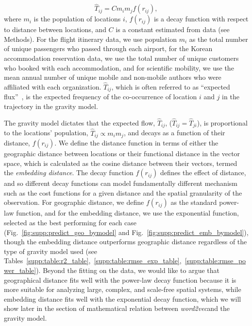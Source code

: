 \documentclass[12pt]{article} %
\begin{document}
\begin{equation}
	\label{eq:gravity_basic}
	\hat{T}_{ij} = Cm_{i}m_{j}f(r_{ij}),
\end{equation}
where $m_{i}$ is the population of locations $i$,  $f(r_{ij})$ is a decay function with respect to distance between locations, and $C$ is a constant estimated from data (see Methods).
For the flight itinerary data, we use population $m_{i}$ as the total number of unique passengers who passed through each airport, for the Korean accommodation reservation data, we use the total number of unique customers who booked with each accommodation, and for scientific mobility, we use the mean annual number of unique mobile and non-mobile authors who were affiliated with each organization.
$\hat{T}_{ij}$, which is often referred to as ``expected flux''~\autocite{simini2012universal}, is the expected frequency of the co-occurrence of location $i$ and $j$ in the trajectory in the gravity model.

The gravity model dictates that the expected flow, $\hat{T}_{ij}$, ($\hat{T}_{ij }= \hat{T}_{ji}$), is proportional to the locations' population, $\hat{T}_{ij} \propto m_{i} m_{j}$, and decays as a function of their distance, $f(r_{ij})$.
We define the distance function in terms of either the geographic distance between locations or their functional distance in the vector space, which is calculated as the cosine distance between their vectors, termed the \textit{embedding distance}.
The decay function $f(r_{ij})$ defines the effect of distance, and so different decay functions can model fundamentally different mechanism \autocite{barthelemy2011spatial} such as the cost functions for a given distance and the spatial granularity of the observation.
For geographic distance, we define $f(r_{ij})$ as the standard power-law function, and for the embedding distance, we use the exponential function, selected as the best performing for each case (Fig.~\ref{fig:supp:predict_geo_bymodel} and Fig.~\ref{fig:supp:predict_emb_bymodel}), though the embedding distance outperforms geographic distance regardless of the type of gravity model used (see Tables~\ref{supp:table:r2_table},~\ref{supp:table:rmse_exp_table},~\ref{supp:table:rmse_power_table}).
Beyond the fitting on the data, we would like to argue that geographical distance fits well with the power-law decay function because it is more suitable for analyzing large, complex, and scale-free spatial systems\autocite{chen2015distance}, while embedding distance fits well with the exponential decay function, which we will show later in the section of mathematical relation between \textit{word2vec}and the gravity model.
\end{document}
